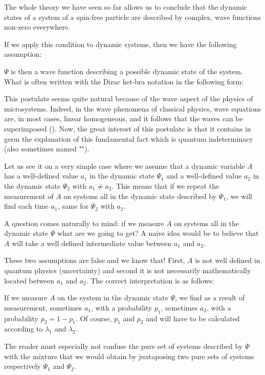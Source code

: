 	The whole theory we have seen so far allows us to conclude that the dynamic states of a system of a spin-free particle are described by complex, wave functions non-zero everywhere.

	If we apply this condition to dynamic systems, then we have the following assumption:
	
	$\Psi$ is then a wave function describing a possible dynamic state of the system. What is often written  with the Dirac ket-bra notation in the following form:
	
	This postulate seems quite natural because of the wave aspect of the physics of microsystems. Indeed, in the wave phenomena of classical physics, wave equations are, in most cases, linear homogeneous, and it follows that the waves can be superimposed (). Now, the great interest of this postulate is that it contains in germ the explanation of this fundamental fact which is quantum indeterminacy (also sometimes named "").
	
	Let us see it on a very simple case where we assume that a dynamic variable $A$ has a well-defined value $a_1$ in the dynamic state $\Psi_1$ and a well-defined value $a_2$ in the dynamic state $\Psi_2$ with $a_1\neq a_2$. This means that if we repeat the measurement of $A$ on systems all in the dynamic state described by $\Psi_1$, we will find each time $a_1$, same for $\Psi_2$ with $a_2$.
	
	A question comes naturally to mind: if we measure $A$ on systems all in the dynamic state $\Psi$ what are we going to get? A naive idea would be to believe that $A$ will take a well defined intermediate value between $a_1$ and $a_2$.

	These two assumptions are false and we know that! First, $A$ is not well defined in quantum physics (uncertainty) and second it is not necessarily mathematically located between $a_1$ and $a_2$. The correct interpretation is as follows:
	
	If we measure $A$ on the system in the dynamic state $\Psi$, we find as a result of measurement, sometimes $a_1$, with a probability $p_1$, sometimes $a_2$, with a probability $p_2=1-p_1$. Of course, $p_1$ and $p_2$ and will have to be calculated according to $\lambda_1$ and $\lambda_2$.
	
	\begin{tcolorbox}[title=Remark,colframe=black,arc=10pt]
	The reader must especially not confuse the pure set of systems described by $\Psi$ with the mixture that we would obtain by juxtaposing two pure sets of systems respectively $\Psi_1$ and $\Psi_2$.
	\end{tcolorbox}
	
